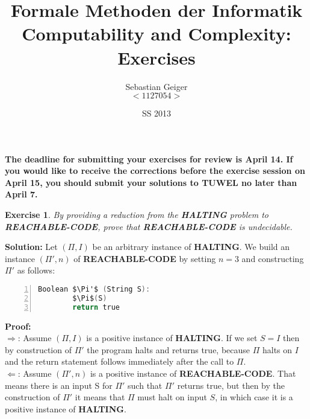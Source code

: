 \documentclass [10pt]{article}
\title{Formale Methoden der Informatik \\
 Computability and Complexity: Exercises }
\author{Sebastian Geiger\\$<1127054>$}
\date{SS 2013}
\newtheorem{exercise}[theorem]{Exercise}
\begin{document}


\maketitle
\textbf{ The deadline for submitting your exercises for review is
  April 14. If you would like to receive the corrections before the
  exercise session on April 15, you should submit your solutions to TUWEL no
  later than  April 7.  }



\begin{exercise}
  By providing a reduction from the \textbf{HALTING} problem to
  \textbf{REACHABLE-CODE}, prove that \textbf{REACHABLE-CODE} is
  undecidable.
\end{exercise}

\medskip

\textbf{Solution:}
Let $(\Pi, I)$ be an arbitrary instance of \textbf{HALTING}. We build an instance $(\Pi', n)$ of \textbf{REACHABLE-CODE} by setting $n=3$ and constructing $\Pi'$ as follows:
\begin{lstlisting}[mathescape, language=C, numbers=left, basicstyle=\ttfamily, backgroundcolor=\color{lightlightgray},]
    Boolean $\Pi'$ (String S):
        $\Pi$(S)
        return true
\end{lstlisting}

\textbf{Proof:}\\
$\Rightarrow$: Assume $(\Pi, I)$ is a positive instance of \textbf{HALTING}. If we set $S=I$ then by construction of $\Pi'$ the program halts and returns true, because $\Pi$ halts on $I$ and the return statement follows immediately after the call to $\Pi$.\\
$\Leftarrow$: Assume $(\Pi', n)$ is a positive instance of \textbf{REACHABLE-CODE}. That means there is an input S for $\Pi'$ such that $\Pi'$ returns true, but then by the construction of $\Pi'$ it means that $\Pi$ must halt on input $S$, in which case it is a positive instance of \textbf{HALTING}.
\end{document}
